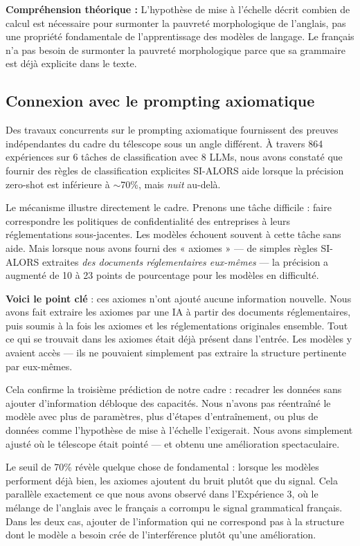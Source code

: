 \documentclass[11pt,a4paper]{article}
\begin{document}
\textbf{Compréhension théorique :} L'hypothèse de mise à l'échelle décrit combien de calcul est nécessaire pour surmonter la pauvreté morphologique de l'anglais, pas une propriété fondamentale de l'apprentissage des modèles de langage. Le français n'a pas besoin de surmonter la pauvreté morphologique parce que sa grammaire est déjà explicite dans le texte.

\subsection{Connexion avec le prompting axiomatique}

Des travaux concurrents sur le prompting axiomatique \citep{wasserman2025axiomatic} fournissent des preuves indépendantes du cadre du télescope sous un angle différent. À travers 864 expériences sur 6 tâches de classification avec 8 LLMs, nous avons constaté que fournir des règles de classification explicites SI-ALORS aide lorsque la précision zero-shot est inférieure à $\sim$70\%, mais \textit{nuit} au-delà.

Le mécanisme illustre directement le cadre. Prenons une tâche difficile : faire correspondre les politiques de confidentialité des entreprises à leurs réglementations sous-jacentes. Les modèles échouent souvent à cette tâche sans aide. Mais lorsque nous avons fourni des « axiomes » --- de simples règles SI-ALORS extraites \textit{des documents réglementaires eux-mêmes} --- la précision a augmenté de 10 à 23 points de pourcentage pour les modèles en difficulté.

\textbf{Voici le point clé} : ces axiomes n'ont ajouté aucune information nouvelle. Nous avons fait extraire les axiomes par une IA à partir des documents réglementaires, puis soumis à la fois les axiomes et les réglementations originales ensemble. Tout ce qui se trouvait dans les axiomes était déjà présent dans l'entrée. Les modèles y avaient accès --- ils ne pouvaient simplement pas extraire la structure pertinente par eux-mêmes.

Cela confirme la troisième prédiction de notre cadre : recadrer les données sans ajouter d'information débloque des capacités. Nous n'avons pas réentraîné le modèle avec plus de paramètres, plus d'étapes d'entraînement, ou plus de données comme l'hypothèse de mise à l'échelle l'exigerait. Nous avons simplement ajusté où le télescope était pointé --- et obtenu une amélioration spectaculaire.

Le seuil de 70\% révèle quelque chose de fondamental : lorsque les modèles performent déjà bien, les axiomes ajoutent du bruit plutôt que du signal. Cela parallèle exactement ce que nous avons observé dans l'Expérience 3, où le mélange de l'anglais avec le français a corrompu le signal grammatical français. Dans les deux cas, ajouter de l'information qui ne correspond pas à la structure dont le modèle a besoin crée de l'interférence plutôt qu'une amélioration.
\end{document}
